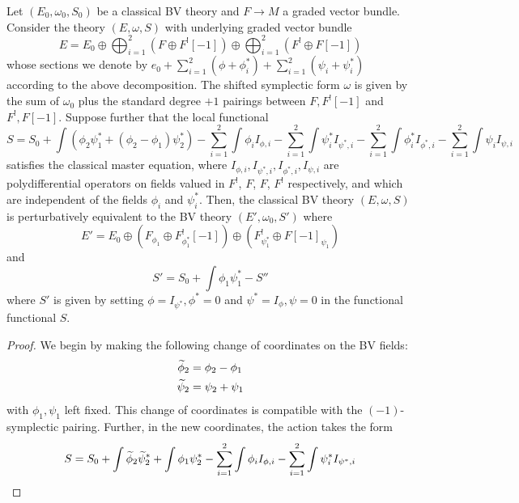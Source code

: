 \documentclass[10pt, oneside]{article}
\begin{document}
\begin{cor} \label{cor: quad}
Let $(E_0, \omega_0, S_0)$ be a classical BV theory and $F \to M$ a graded vector bundle.
Consider the theory $(E, \omega, S)$ with underlying graded vector bundle
\[
E = E_0 \oplus \bigoplus_{i=1}^2 \left(F \oplus F^! [-1]\right) \oplus \bigoplus_{i=1}^2 \left(F^!  \oplus F[-1] \right)
\]
whose sections we denote by $e_0 + \sum_{i=1}^2 (\phi + \phi_i^*) + \sum_{i=1}^2(\psi_i + \psi_i^*)$ according to the above decomposition. 
The shifted symplectic form $\omega$ is given by the sum of $\omega_0$ plus the standard degree $+1$ pairings between $F, F^! [-1]$ and $F^!, F[-1]$.
Suppose further that the local functional
\[
S = S_0 + \int \left(\phi_2\psi^*_1 + (\phi_2 - \phi_1)\psi_2^*\right) -  \sum_{i=1}^2 \int \phi_i I_{\phi,i} - \sum_{i=1}^2 \int \psi_i^* I_{\psi^*,i} -  \sum_{i=1}^2 \int \phi^*_i I_{\phi^*,i} - \sum_{i=1}^2 \int \psi_i I_{\psi,i} 
\]
satisfies the classical master equation, where $I_{\phi,i}, I_{\psi^*,i}, I_{\phi^*,i}, I_{\psi,i}$ are polydifferential operators on fields valued in $F^!$, $F$, $F$, $F^!$ respectively, and which are independent of the fields $\phi_i$ and $\psi^*_i$.
Then, the classical BV theory $(E, \omega, S)$ is perturbatively equivalent to the BV theory $(E', \omega_0, S')$ where 
\[
E' = E_0 \oplus \left(F_{\phi_1} \oplus F^!_{\phi_1^*} [-1]\right) \oplus \left(F^!_{\psi_1^*} \oplus F[-1]_{\psi_1} \right)
\]
and
\[
S' = S_0 + \int \phi_1 \psi_1^* - S''
\]
where $S'$ is given by setting $\phi = I_{\psi^*}, \phi^* = 0$ and $\psi^* = I_{\phi}, \psi = 0$ in the functional functional $S$.
\end{cor}
\begin{proof}
We begin by making the following change of coordinates on the BV fields:
\begin{align*}
\Tilde{\phi}_2 & = \phi_2 - \phi_1 \\
\Tilde{\psi}_2 & = \psi_2 + \psi_1 \\
\end{align*}
with $\phi_1, \psi_1$ left fixed. 
This change of coordinates is compatible with the $(-1)$-symplectic pairing. 
Further, in the new coordinates, the action takes the form
\[
S = S_0 + \int \Tilde{\phi}_2\Tilde{\psi}^*_2 + \int \phi_1\psi_2^* -  \sum_{i=1}^2 \int \phi_i I_{\phi,i} - \sum_{i=1}^2 \int \psi_i^* I_{\psi^*,i} 
\]
\end{proof} 
\end{document}
